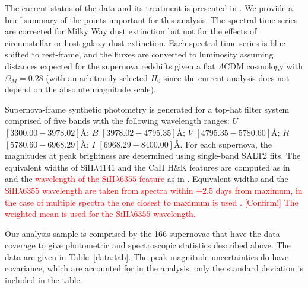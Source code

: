 \documentclass{aastex61}   	%
\begin{document}
The current status of the data and its treatment is presented in \citet{2015ApJ...815...58F}.
We provide a brief summary of the points important for this analysis.
The spectral time-series  are corrected for Milky Way dust
extinction \citep{1989ApJ...345..245C,1998ApJ...500..525S} but not for the
effects of circumstellar or host-galaxy dust extinction.  
Each spectral time series is
blue-shifted to rest-frame, and the fluxes are converted to luminosity assuming
distances expected for the supernova redshifts given a flat
$\Lambda$CDM cosmology with $\Omega_M = 0.28$ (with an arbitrarily selected
$H_0$ since the current analysis does not depend on the absolute magnitude scale).

Supernova-frame synthetic photometry is generated for a top-hat filter system
comprised of five 
\color{red}
bands with the following wavelength ranges: $U$ $[3300.00 - 3978.02]$\AA;
$B$ $[3978.02-4795.35]$\AA;
$V$ $[4795.35-5780.60]$\AA;
$R$ $[5780.60-6968.29]$\AA;
$I$ $[6968.29-8400.00]$\AA.
\color{black}
For each supernova, the magnitudes at peak brightness are determined using single-band SALT2 fits.
The equivalent widths of SiII$\lambda 4141$ and the CaII H\&K features are computed as
in \citet{2008A&A...477..717B} and the 
\textcolor{red}{wavelength of the SiII$\lambda 6355$ feature}
as in \citet{chotard:thesis}.
Equivalent widths and the
\textcolor{red}{SiII$\lambda 6355$ wavelength are taken from spectra  within $\pm 2.5$ days from maximum, in the case of multiple spectra the one
closest to maximum is used \citep{chotard:thesis}. [Confirm!]
The weighted mean is used for the  SiII$\lambda 6355$ wavelength.}

Our analysis sample is comprised by the
166
supernovae that have the data coverage to 
give photometric and spectroscopic statistics described above.
The data are given in Table~\ref{data:tab}.
The peak magnitude uncertainties do have covariance, which are accounted
for in the analysis; only the standard deviation is included in the table.
\end{document}
